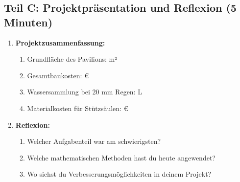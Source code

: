 \subsection*{Teil C: Projektpräsentation und Reflexion (5 Minuten)}

\begin{enumerate}[label=\arabic*.,resume]

    \item \textbf{Projektzusammenfassung:}

    \begin{enumerate}[label=\alph*)]
        \item Grundfläche des Pavilions: \underline{\hspace{4cm}} m²

        \item Gesamtbaukosten: \underline{\hspace{4cm}} €

        \item Wassersammlung bei 20 mm Regen: \underline{\hspace{4cm}} L

        \item Materialkosten für Stützsäulen: \underline{\hspace{4cm}} €

    \end{enumerate}

    \vspace{1cm}

    \item \textbf{Reflexion:}

    \begin{enumerate}[label=\alph*)]
        \item Welcher Aufgabenteil war am schwierigsten?

        \vspace{1.5cm}

        \item Welche mathematischen Methoden hast du heute angewendet?

        \vspace{1.5cm}

        \item Wo siehst du Verbesserungsmöglichkeiten in deinem Projekt?

    \end{enumerate}

\end{enumerate}